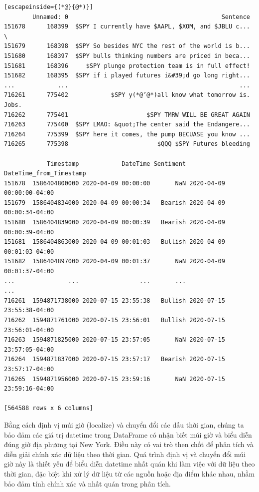 \begin{lstlisting}[escapeinside={(*@}{@*)}]
        Unnamed: 0                                           Sentence   
151678      168399  $SPY I currently have $AAPL, $XOM, and $JBLU c...  \
151679      168398  $SPY So besides NYC the rest of the world is b...   
151680      168397  $SPY bulls thinking numbers are priced in beca...   
151681      168396     $SPY plunge protection team is in full effect!   
151682      168395  $SPY if i played futures i&#39;d go long right...   
...            ...                                                ...   
716261      775402            $SPY y(*@’@*)all know what tomorrow is. Jobs.   
716262      775401                      $SPY TMRW WILL BE GREAT AGAIN   
716263      775400  $SPY LMAO: &quot;The center said the Endangere...   
716264      775399  $SPY here it comes, the pump BECUASE you know ...   
716265      775398                         $QQQ $SPY Futures bleeding   

            Timestamp            DateTime Sentiment   DateTime_from_Timestamp  
151678  1586404800000 2020-04-09 00:00:00       NaN 2020-04-09 00:00:00-04:00  
151679  1586404834000 2020-04-09 00:00:34   Bearish 2020-04-09 00:00:34-04:00  
151680  1586404839000 2020-04-09 00:00:39   Bearish 2020-04-09 00:00:39-04:00  
151681  1586404863000 2020-04-09 00:01:03   Bullish 2020-04-09 00:01:03-04:00  
151682  1586404897000 2020-04-09 00:01:37       NaN 2020-04-09 00:01:37-04:00  
...               ...                 ...       ...                       ...  
716261  1594871738000 2020-07-15 23:55:38   Bullish 2020-07-15 23:55:38-04:00  
716262  1594871761000 2020-07-15 23:56:01   Bullish 2020-07-15 23:56:01-04:00  
716263  1594871825000 2020-07-15 23:57:05       NaN 2020-07-15 23:57:05-04:00  
716264  1594871837000 2020-07-15 23:57:17   Bearish 2020-07-15 23:57:17-04:00  
716265  1594871956000 2020-07-15 23:59:16       NaN 2020-07-15 23:59:16-04:00  

[564588 rows x 6 columns]
\end{lstlisting}

Bằng cách định vị múi giờ (localize) và chuyển đổi các dấu thời gian, chúng ta bảo đảm các giá trị datetime trong DataFrame có nhận biết múi giờ và biểu diễn đúng giờ địa phương tại New York. Điều này có vai trò then chốt để phân tích và diễn giải chính xác dữ liệu theo thời gian. Quá trình định vị và chuyển đổi múi giờ này là thiết yếu để biểu diễn datetime nhất quán khi làm việc với dữ liệu theo thời gian, đặc biệt khi xử lý dữ liệu từ các nguồn hoặc địa điểm khác nhau, nhằm bảo đảm tính chính xác và nhất quán trong phân tích.

